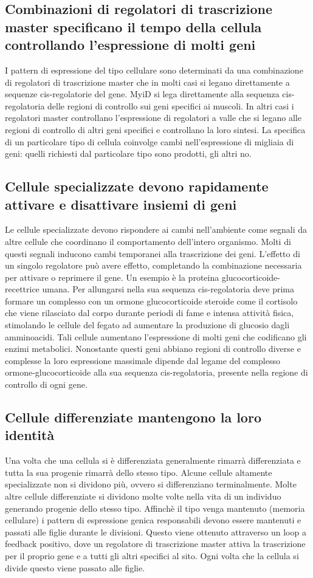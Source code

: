 \subsection{Combinazioni di regolatori di trascrizione master specificano il tempo della cellula controllando l'espressione di molti geni}
I pattern di espressione del tipo cellulare sono determinati da una combinazione di regolatori di trascrizione master che in molti casi si legano direttamente a sequenze cis-regolatorie
del gene. MyiD si lega direttamente alla sequenza cis-regolatoria delle regioni di controllo sui geni specifici ai muscoli. In altri casi i regolatori master controllano l'espressione
di regolatori a valle che si legano alle regioni di controllo di altri geni specifici e controllano la loro sintesi. La specifica di un particolare tipo di cellula coinvolge cambi 
nell'espressione di migliaia di geni: quelli richiesti dal particolare tipo sono prodotti, gli altri no. 
\subsection{Cellule specializzate devono rapidamente attivare e disattivare insiemi di geni}
Le cellule specializzate devono rispondere ai cambi nell'ambiente come segnali da altre cellule che coordinano il comportamento dell'intero organismo. Molti di questi segnali inducono
cambi temporanei alla trascrizione dei geni. L'effetto di un singolo regolatore pu\`o avere effetto, completando la combinazione necessaria per attivare o reprimere il gene. Un esempio 
\`e la proteina glucocorticoide-recettrice umana. Per allungarsi nella sua sequenza cis-regolatoria deve prima formare un complesso con un ormone glucocorticoide steroide come il cortisolo
che viene rilasciato dal corpo durante periodi di fame e intensa attivit\`a fisica, stimolando le cellule del fegato ad aumentare la produzione di glucosio dagli amminoacidi. Tali 
cellule aumentano l'espressione di molti geni che codificano gli enzimi metabolici. Nonostante questi geni abbiano regioni di controllo diverse e complesse la loro espressione massimale
dipende dal legame del complesso ormone-glucocorticoide alla sua sequenza cis-regolatoria, presente nella regione di controllo di ogni gene. 
\subsection{Cellule differenziate mantengono la loro identit\`a}
Una volta che una cellula si \`e differenziata generalmente rimarr\`a differenziata e tutta la sua progenie rimarr\`a dello stesso tipo. Alcune cellule altamente specializzate non si
dividono pi\`u, ovvero si differenziano terminalmente. Molte altre cellule differenziate si dividono molte volte nella vita di un individuo generando progenie dello stesso tipo. 
Affinch\`e il tipo venga mantenuto (memoria cellulare) i pattern di espressione genica responsabili devono essere mantenuti e passati alle figlie durante le divisioni. Questo 
viene ottenuto attraverso un loop a feedback positivo, dove un regolatore di trascrizione master attiva la trascrizione per il proprio gene e a tutti gli altri specifici al sito. Ogni
volta che la cellula si divide questo viene passato alle figlie. 
